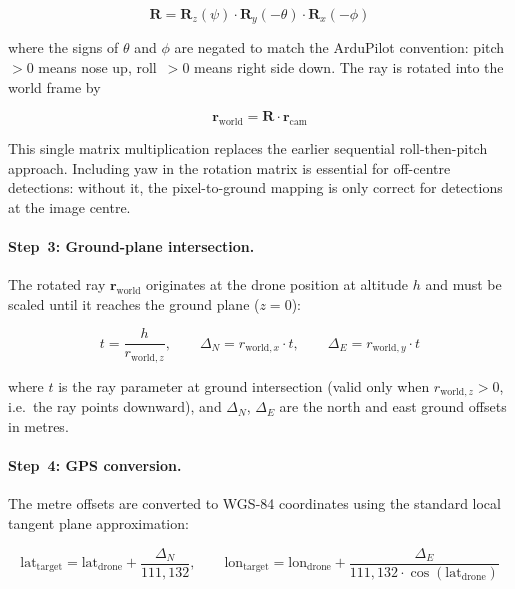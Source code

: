\begin{equation}\label{eq:full-rotation}
  \mathbf{R} = \mathbf{R}_z(\psi) \cdot \mathbf{R}_y(-\theta) \cdot \mathbf{R}_x(-\phi)
\end{equation}

\noindent where the signs of $\theta$ and $\phi$ are negated to match the ArduPilot convention: pitch~$> 0$ means nose up, roll~$> 0$ means right side down.  The ray is rotated into the world frame by

\begin{equation}\label{eq:tilt-rotation}
  \mathbf{r}_\mathrm{world} = \mathbf{R} \cdot \mathbf{r}_\mathrm{cam}
\end{equation}

\noindent This single matrix multiplication replaces the earlier sequential roll-then-pitch approach.  Including yaw in the rotation matrix is essential for off-centre detections: without it, the pixel-to-ground mapping is only correct for detections at the image centre.

\paragraph{Step~3: Ground-plane intersection.}
The rotated ray $\mathbf{r}_\mathrm{world}$ originates at the drone position at altitude $h$ and must be scaled until it reaches the ground plane ($z = 0$):

\begin{equation}\label{eq:ground-intersect}
  t = \frac{h}{r_{\mathrm{world},z}}, \qquad
  \Delta_N = r_{\mathrm{world},x} \cdot t, \qquad
  \Delta_E = r_{\mathrm{world},y} \cdot t
\end{equation}

\noindent where $t$ is the ray parameter at ground intersection (valid only when $r_{\mathrm{world},z} > 0$, i.e.\ the ray points downward), and $\Delta_N$, $\Delta_E$ are the north and east ground offsets in metres.

\paragraph{Step~4: GPS conversion.}
The metre offsets are converted to WGS-84 coordinates using the standard local tangent plane approximation:

\begin{equation}\label{eq:tilt-gps}
  \mathrm{lat}_\mathrm{target} = \mathrm{lat}_\mathrm{drone} + \frac{\Delta_N}{111{,}132}, \qquad
  \mathrm{lon}_\mathrm{target} = \mathrm{lon}_\mathrm{drone} + \frac{\Delta_E}{111{,}132 \cdot \cos(\mathrm{lat}_\mathrm{drone})}
\end{equation}

